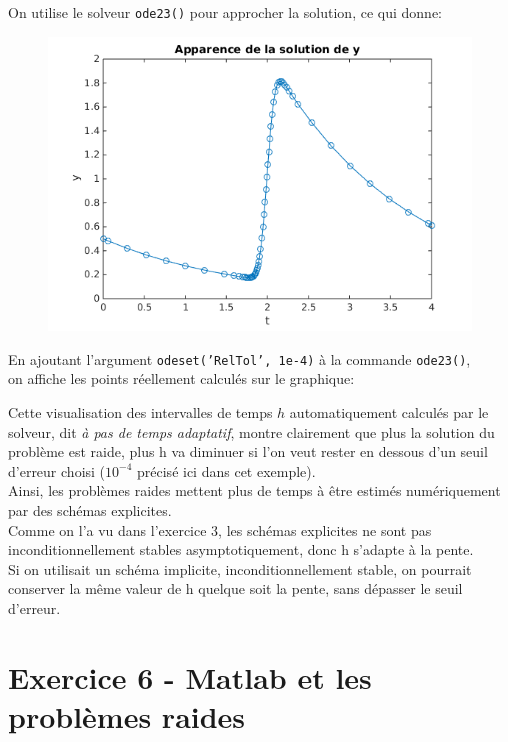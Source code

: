 \documentclass[a4paper,12pt,landscape]{article}
\begin{document}
On utilise le solveur \texttt{ode23()} pour approcher la solution, ce qui donne:\\
\vspace{2cm}
\begin{figure}
	\includegraphics[scale=0.55]{ex5_2.png}
\end{figure}
\vspace{2cm}


En ajoutant l'argument \texttt{odeset(’RelTol’, 1e-4)} à la commande \texttt{ode23()},\\ on affiche les points réellement calculés sur le graphique:
\vspace{3cm}

Cette visualisation des intervalles de temps $h$ automatiquement calculés par le solveur, dit \textit{à pas de temps adaptatif}, montre clairement que plus la solution du problème est raide, plus h va diminuer si l'on veut rester en dessous d'un seuil d'erreur choisi ($10^{-4}$ précisé ici dans cet exemple).\\

Ainsi, les problèmes raides mettent plus de temps à être estimés numériquement par des schémas explicites.\\
Comme on l'a vu dans l'exercice 3, les schémas explicites ne sont pas inconditionnellement stables asymptotiquement, donc h s'adapte à la pente.\\
Si on utilisait un schéma implicite, inconditionnellement stable, on pourrait conserver la même valeur de h quelque soit la pente, sans dépasser le seuil d'erreur.

\newpage
\section{Exercice 6 - Matlab et les problèmes raides}
\end{document}
